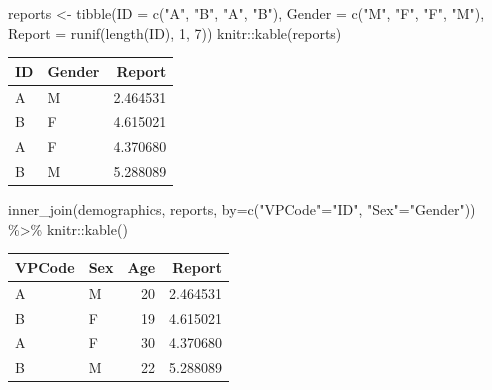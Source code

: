 \documentclass[
]{book}
\newenvironment{Shaded}{\begin{snugshade}}{\end{snugshade}}
\newcommand{\AttributeTok}[1]{\textcolor[rgb]{0.77,0.63,0.00}{#1}}
\newcommand{\DecValTok}[1]{\textcolor[rgb]{0.00,0.00,0.81}{#1}}
\newcommand{\FunctionTok}[1]{\textcolor[rgb]{0.00,0.00,0.00}{#1}}
\newcommand{\NormalTok}[1]{#1}
\newcommand{\OtherTok}[1]{\textcolor[rgb]{0.56,0.35,0.01}{#1}}
\newcommand{\SpecialCharTok}[1]{\textcolor[rgb]{0.00,0.00,0.00}{#1}}
\newcommand{\StringTok}[1]{\textcolor[rgb]{0.31,0.60,0.02}{#1}}
\begin{document}
\begin{Shaded}
\begin{Highlighting}[]
\NormalTok{reports }\OtherTok{\textless{}{-}} \FunctionTok{tibble}\NormalTok{(}\AttributeTok{ID =} \FunctionTok{c}\NormalTok{(}\StringTok{"A"}\NormalTok{, }\StringTok{"B"}\NormalTok{, }\StringTok{"A"}\NormalTok{, }\StringTok{"B"}\NormalTok{),}
                  \AttributeTok{Gender =} \FunctionTok{c}\NormalTok{(}\StringTok{"M"}\NormalTok{, }\StringTok{"F"}\NormalTok{, }\StringTok{"F"}\NormalTok{, }\StringTok{"M"}\NormalTok{),}
                  \AttributeTok{Report =} \FunctionTok{runif}\NormalTok{(}\FunctionTok{length}\NormalTok{(ID), }\DecValTok{1}\NormalTok{, }\DecValTok{7}\NormalTok{))}
\NormalTok{knitr}\SpecialCharTok{::}\FunctionTok{kable}\NormalTok{(reports)}
\end{Highlighting}
\end{Shaded}

\begin{tabular}{l|l|r}
\hline
ID & Gender & Report\\
\hline
A & M & 2.464531\\
\hline
B & F & 4.615021\\
\hline
A & F & 4.370680\\
\hline
B & M & 5.288089\\
\hline
\end{tabular}

\begin{Shaded}
\begin{Highlighting}[]
\FunctionTok{inner\_join}\NormalTok{(demographics, reports, }\AttributeTok{by=}\FunctionTok{c}\NormalTok{(}\StringTok{"VPCode"}\OtherTok{=}\StringTok{"ID"}\NormalTok{, }\StringTok{"Sex"}\OtherTok{=}\StringTok{"Gender"}\NormalTok{)) }\SpecialCharTok{\%\textgreater{}\%}
\NormalTok{  knitr}\SpecialCharTok{::}\FunctionTok{kable}\NormalTok{()}
\end{Highlighting}
\end{Shaded}

\begin{tabular}{l|l|r|r}
\hline
VPCode & Sex & Age & Report\\
\hline
A & M & 20 & 2.464531\\
\hline
B & F & 19 & 4.615021\\
\hline
A & F & 30 & 4.370680\\
\hline
B & M & 22 & 5.288089\\
\hline
\end{tabular}
\end{document}
